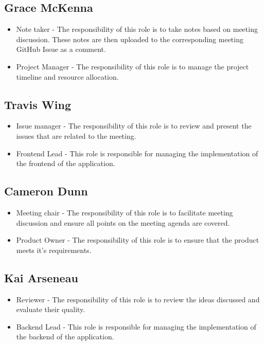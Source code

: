 \documentclass{article}
\begin{document}
\subsection*{Grace McKenna}
\begin{itemize}
	\item Note taker - The responsibility of this role is to take notes based on meeting discussion. These notes are then uploaded to the corresponding meeting GitHub Issue as a comment. 
  \item Project Manager - The responsibility of this role is to manage the project timeline and resource allocation. 
\end{itemize}

\subsection*{Travis Wing}
\begin{itemize}
	\item Issue manager - The responsibility of this role is to review and present the issues that are related to the meeting. 
	\item Frontend Lead - This role is responsible for managing the implementation of the frontend of the application.
\end{itemize}

\subsection*{Cameron Dunn}
\begin{itemize}
	\item Meeting chair - The responsibility of this role is to facilitate meeting discussion and ensure all points on the meeting agenda are covered. 
  \item Product Owner - The responsibility of this role is to ensure that the product meets it's requirements.  
\end{itemize}

\subsection*{Kai Arseneau}
\begin{itemize}
	\item Reviewer - The responsibility of this role is to review the ideas discussed and evaluate their quality.  
	\item Backend Lead - This role is responsible for managing the implementation of the backend of the application.
\end{itemize}
\end{document}
